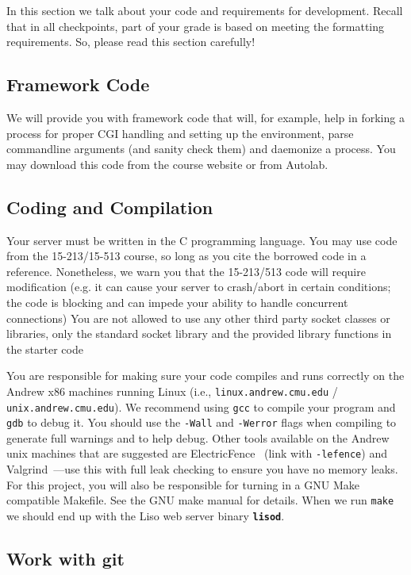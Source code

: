 In this section we talk about your code and requirements for development.
Recall that in all checkpoints, part of your grade is based on meeting the formatting requirements. So, please read this section carefully!

\subsection{Framework Code} 
We will provide you with framework code that will, for example, help in forking
a process for proper CGI handling and setting up the environment, parse
commandline arguments (and sanity check them) and daemonize a process.
You may download this code from the course website or from Autolab.

\subsection{Coding and Compilation}
Your server must be written in the C programming language. 
You may use code from the 15-213/15-513 course, so long as you cite the borrowed
code in a reference. 
Nonetheless, we warn you that the 15-213/513 code will require modification (e.g. it can cause your server to crash/abort in certain conditions; the code is blocking and can impede your ability to handle concurrent connections)
You are not allowed
to use any other third party socket classes or libraries, only the standard socket library
and the provided library functions in the starter code 


You are responsible for making sure your code compiles and runs correctly on
the Andrew x86 machines running Linux (i.e., \texttt{linux.andrew.cmu.edu} /
\texttt{unix.andrew.cmu.edu}). We recommend using \texttt{gcc} to compile your
program and \texttt{gdb} to debug it. You should use the \texttt{-Wall} and
\texttt{-Werror} flags when compiling to generate full warnings and to help
debug. Other tools available on the Andrew unix machines that are suggested are
ElectricFence~\cite{WWW:efence} (link with \texttt{-lefence}) and
Valgrind~\cite{WWW:Valgrind}---use this with full leak checking to ensure you
have no memory leaks.  For this project, you will also be responsible
for turning in a GNU Make compatible Makefile. See the GNU make
manual\cite{Manual:Make} for details. When we run \texttt{make} we should end
up with the Liso web server binary \textbf{\texttt{lisod}}.


\subsection{Work with git}


